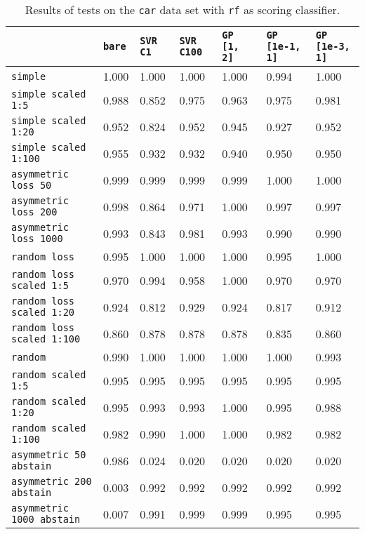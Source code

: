\begin{table}
{\scriptsize
\begin{tabu}{l|l|l|l|l|l|l}
&\texttt{bare} &\texttt{SVR C1} &\texttt{SVR C100} &\texttt{GP [1, 2]} &\texttt{GP [1e-1, 1]} &\texttt{GP [1e-3, 1]}  \\
\hline
\texttt{simple} &1.000 &1.000 &1.000 &1.000 &0.994 &1.000 \\
\texttt{simple scaled 1:5} &0.988 &0.852 &0.975 &0.963 &0.975 &0.981 \\
\texttt{simple scaled 1:20} &0.952 &0.824 &0.952 &0.945 &0.927 &0.952 \\
\texttt{simple scaled 1:100} &0.955 &0.932 &0.932 &0.940 &0.950 &0.950 \\
\texttt{asymmetric loss 50} &0.999 &0.999 &0.999 &0.999 &1.000 &1.000 \\
\texttt{asymmetric loss 200} &0.998 &0.864 &0.971 &1.000 &0.997 &0.997 \\
\texttt{asymmetric loss 1000} &0.993 &0.843 &0.981 &0.993 &0.990 &0.990 \\
\texttt{random loss} &0.995 &1.000 &1.000 &1.000 &0.995 &1.000 \\
\texttt{random loss scaled 1:5} &0.970 &0.994 &0.958 &1.000 &0.970 &0.970 \\
\texttt{random loss scaled 1:20} &0.924 &0.812 &0.929 &0.924 &0.817 &0.912 \\
\texttt{random loss scaled 1:100} &0.860 &0.878 &0.878 &0.878 &0.835 &0.860 \\
\texttt{random} &0.990 &1.000 &1.000 &1.000 &1.000 &0.993 \\
\texttt{random scaled 1:5} &0.995 &0.995 &0.995 &0.995 &0.995 &0.995 \\
\texttt{random scaled 1:20} &0.995 &0.993 &0.993 &1.000 &0.995 &0.988 \\
\texttt{random scaled 1:100} &0.982 &0.990 &1.000 &1.000 &0.982 &0.982 \\
\texttt{asymmetric 50 abstain} &0.986 &0.024 &0.020 &0.020 &0.020 &0.020 \\
\texttt{asymmetric 200 abstain} &0.003 &0.992 &0.992 &0.992 &0.992 &0.992 \\
\texttt{asymmetric 1000 abstain} &0.007 &0.991 &0.999 &0.999 &0.995 &0.995 \\
\end{tabu} }
\caption{Results of tests on the \texttt{car} data set
         with \texttt{rf} as scoring classifier.}
\end{table}

